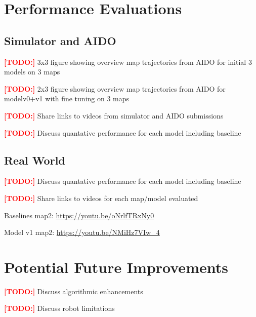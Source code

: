 \documentclass{article}
\newcommand\todo{\textcolor{red}{\textbf{[TODO:] }}}
\begin{document}
\section{Performance Evaluations}

\subsection{Simulator and AIDO}

\todo 3x3 figure showing overview map trajectories from AIDO for initial 3 models on 3 maps

\todo 2x3 figure showing overview map trajectories from AIDO for modelv0+v1 with fine tuning on 3 maps

\todo Share links to videos from simulator and AIDO submissions

\todo Discuss quantative performance for each model including baseline

\subsection{Real World}

\todo Discuss quantative performance for each model including baseline

\todo Share links to videos for each map/model evaluated

Baselines map2:
\url{https://youtu.be/oNrlfTRxNy0}

Model v1 map2:
\url{https://youtu.be/NMiHz7VIw_4}

\section{Potential Future Improvements}

\todo Discuss algorithmic enhancements

\todo Discuss robot limitations



\end{document}
